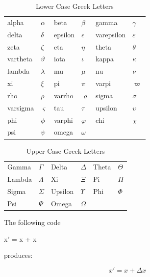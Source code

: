 \begin{table}[htbp]
\caption{Lower Case Greek Letters}
\label{tab:greek}
\centering
\begin{tabular}{llllll}
\gls{alpha} & $\alpha$ &
\gls{beta} & $\beta$ &
\gls{gamma} & $\gamma$ \\
\gls{delta} & $\delta$  &
\gls{epsilon} & $\epsilon$ &
\gls{varepsilon} & $\varepsilon$\\
\gls{zeta} & $\zeta$ &
\gls{eta} & $\eta$ &
\gls{theta} & $\theta$ \\
\gls{vartheta} & $\vartheta$ &
\gls{iota} & $\iota$ & 
\gls{kappa} & $\kappa$ \\
\gls{lambda} & $\lambda$ &
\gls{mu} & $\mu$ &
\gls{nu} & $\nu$ \\
\gls{xi} & $\xi$ &
\gls{pi} & $\pi$ &
\gls{varpi} & $\varpi$\\
\gls{rho} & $\rho$ &
\gls{varrho} & $\varrho$ &
\gls{sigma} & $\sigma$ \\
\gls{varsigma} & $\varsigma$ &
\gls{tau} & $\tau$ &
\gls{upsilon} & $\upsilon$ \\
\gls{phi} & $\phi$ &
\gls{varphi} & $\varphi$ &
\gls{chi} & $\chi$ \\
\gls{psi} & $\psi$ &
\gls{omega} & $\omega$ 
\end{tabular}
\end{table}

\begin{table}[htbp]
\caption{Upper Case Greek Letters}
\label{tab:Greek}
\centering
\begin{tabular}{llllll}
\gls{Gamma} & $\Gamma$ &
\gls{Delta} & $\Delta$ &
\gls{Theta} & $\Theta$ \\
\gls{Lambda} & $\Lambda$ &
\gls{Xi} & $\Xi$ &
\gls{Pi} & $\Pi$ \\
\gls{Sigma} & $\Sigma$ &
\gls{Upsilon} & $\Upsilon$ &
\gls{Phi} & $\Phi$ \\
\gls{Psi} & $\Psi$ &
\gls{Omega} & $\Omega$
\end{tabular}
\end{table}


The following code
\begin{codeS}
 x' = x +  x 
\end{codeS}
produces:
\begin{resultS}
\[ x' = x + \Delta x \]
\end{resultS}

